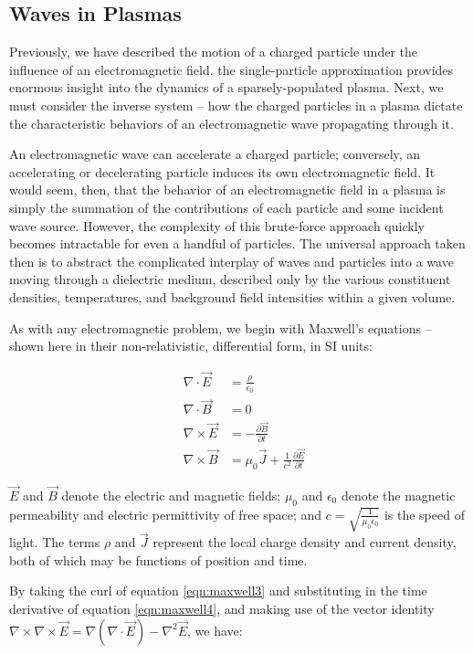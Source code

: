 \subsection{Waves in Plasmas}
Previously, we have described the motion of a charged particle under the influence of an electromagnetic field. the single-particle approximation provides enormous insight into the dynamics of a sparsely-populated plasma. Next, we must consider the inverse system -- how the charged particles in a plasma dictate the characteristic behaviors of an electromagnetic wave propagating through it.

An electromagnetic wave can accelerate a charged particle; conversely, an accelerating or decelerating particle induces its own electromagnetic field. It would seem, then, that the behavior of an electromagnetic field in a plasma is simply the summation of the contributions of each particle and some incident wave source. However, the complexity of this brute-force approach quickly becomes intractable for even a handful of particles. The universal approach taken then is to abstract the complicated interplay of waves and particles into a wave moving through a dielectric medium, described only by the various constituent densities, temperatures, and background field intensities within a given volume. 

As with any electromagnetic problem, we begin with Maxwell's equations -- shown here in their non-relativistic, differential form, in SI units:

\begin{eqnarray}
&\nabla \cdot \vec{E}& = \frac{\rho}{\epsilon_0} \label{eqn:maxwell1}\\
&\nabla \cdot \vec{B}& = 0 \label{eqn:maxwell2}\\
&\nabla \times \vec{E}& = -\frac{\partial \vec{B}}{\partial t} \label{eqn:maxwell3}\\
&\nabla \times \vec{B}& = \mu_0 \vec{J} + \frac{1}{c^2}\frac{\partial \vec{E}}{\partial t} \label{eqn:maxwell4}
\end{eqnarray}

$\vec{E}$ and $\vec{B}$ denote the electric and magnetic fields; $\mu_0$ and $\epsilon_0$ denote the magnetic permeability and electric permittivity of free space; and $c=\sqrt{\frac{1}{\mu_0\epsilon_0}}$ is the speed of light. The terms $\rho$ and $\vec{J}$ represent the local charge density and current density, both of which may be functions of position and time.

By taking the curl of equation \ref{eqn:maxwell3} and substituting in the time derivative of equation \ref{eqn:maxwell4}, and making use of the vector identity $\nabla \times \nabla \times \vec{E} = \nabla(\nabla \cdot \vec{E}) - \nabla^2\vec{E}$, we have:

